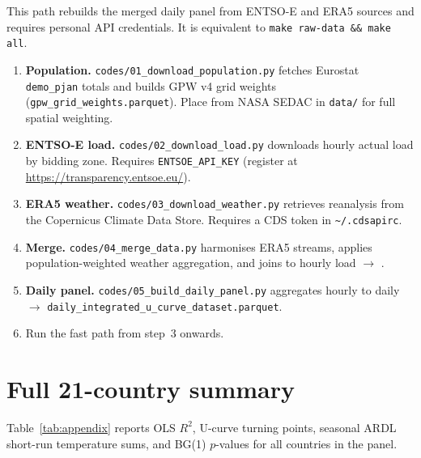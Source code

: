 \documentclass[12pt,a4paper]{article}
\begin{document}
This path rebuilds the merged daily panel from ENTSO-E and ERA5 sources and requires personal API credentials. It is equivalent to \texttt{make raw-data \&\& make all}.

\begin{enumerate}
  \item \textbf{Population.} \texttt{codes/01\_download\_population.py} fetches Eurostat \texttt{demo\_pjan} totals and builds GPW v4 grid weights (\texttt{gpw\_grid\_weights.parquet}). Place  from NASA SEDAC in \texttt{data/} for full spatial weighting.
  \item \textbf{ENTSO-E load.} \texttt{codes/02\_download\_load.py} downloads hourly actual load by bidding zone. Requires \texttt{ENTSOE\_API\_KEY} (register at \url{https://transparency.entsoe.eu/}).
  \item \textbf{ERA5 weather.} \texttt{codes/03\_download\_weather.py} retrieves reanalysis from the Copernicus Climate Data Store. Requires a CDS token in \texttt{\textasciitilde/.cdsapirc}.
  \item \textbf{Merge.} \texttt{codes/04\_merge\_data.py} harmonises ERA5 streams, applies population-weighted weather aggregation, and joins to hourly load $\rightarrow$ .
  \item \textbf{Daily panel.} \texttt{codes/05\_build\_daily\_panel.py} aggregates hourly to daily $\rightarrow$ \texttt{daily\_integrated\_u\_curve\_dataset.parquet}.
  \item Run the fast path from step~3 onwards.
\end{enumerate}

\section{Full 21-country summary}
\label{app:full}

Table~\ref{tab:appendix} reports OLS $R^2$, U-curve turning points, seasonal ARDL short-run temperature sums, and BG(1) $p$-values for all countries in the panel.

\begin{table}[H]
  \centering
  \caption{All-country summary (seasonal ARDL and baseline OLS)}
  \label{tab:appendix}
  \scriptsize
  
\end{table}
\end{document}
